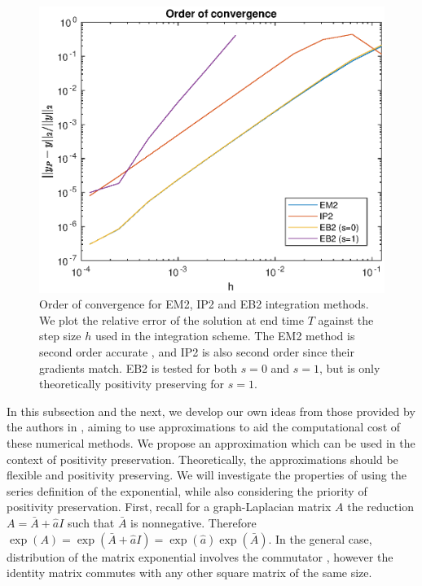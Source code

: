 \begin{figure}
    \centering
    \includegraphics[width=0.65\linewidth]{Matlab/magnusapproximations2.eps}
    \caption{
        Order of convergence for EM2, IP2 and EB2 integration methods.
        We plot the relative error of the solution at end time $T$ against the step size $h$ used in the integration scheme.
        The EM2 method is second order accurate \cite{blanes_pos_2022},
        and IP2 is also second order since their gradients match.
        EB2 is tested for both $s=0$ and $s=1$, but is only theoretically positivity preserving for $s=1$.
    }
    \label{fig:magnusapprxorder}
\end{figure}

In this subsection and the next, we develop our own ideas from those provided by the authors in \cite{blanes_pos_2022},
aiming to use approximations to aid the computational cost of these numerical methods.
We propose an approximation which can be used in the context of positivity preservation.
Theoretically, the approximations should be flexible and positivity preserving.
We will investigate the properties of using the series definition of the exponential, while also considering the priority of positivity preservation.
First, recall for a graph-Laplacian matrix $A$ the reduction $A = \bar{A} + \hat{a}I$ such that $\bar{A}$ is nonnegative.
Therefore $\exp(A) = \exp(\bar{A} + \hat{a}I) = \exp(\hat{a})\exp(\bar{A})$.
In the general case, distribution of the matrix exponential involves the commutator \cite{higham2008exponential},
however the identity matrix commutes with any other square matrix of the same size.

